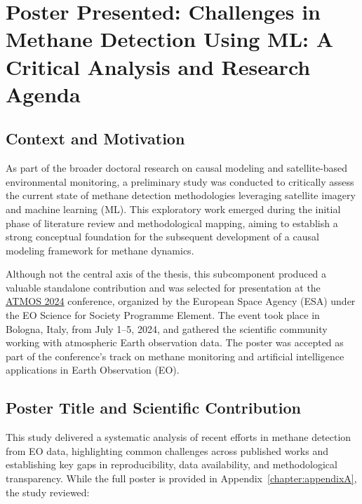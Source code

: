 \cleardoublepage
\label{chap:implement}

\section{Poster Presented: Challenges in Methane Detection Using ML: A Critical Analysis and Research Agenda}

\subsection{Context and Motivation}

As part of the broader doctoral research on causal modeling and satellite-based environmental monitoring, a preliminary study was conducted to critically assess the current state of methane detection methodologies leveraging satellite imagery and machine learning (ML). This exploratory work emerged during the initial phase of literature review and methodological mapping, aiming to establish a strong conceptual foundation for the subsequent development of a causal modeling framework for methane dynamics.

Although not the central axis of the thesis, this subcomponent produced a valuable standalone contribution and was selected for presentation at the \href{https://www.atmos2024.org/}{ATMOS 2024} conference, organized by the European Space Agency (ESA) under the EO Science for Society Programme Element. The event took place in Bologna, Italy, from July 1--5, 2024, and gathered the scientific community working with atmospheric Earth observation data. The poster was accepted as part of the conference’s track on methane monitoring and artificial intelligence applications in Earth Observation (EO).

\subsection{Poster Title and Scientific Contribution}

This study delivered a systematic analysis of recent efforts in methane detection from EO data, highlighting common challenges across published works and establishing key gaps in reproducibility, data availability, and methodological transparency. While the full poster is provided in Appendix~\ref{chapter:appendixA}, the study reviewed:

